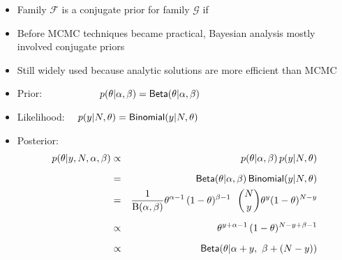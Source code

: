 \documentclass[10pt]{report}
\begin{document}
\begin{itemize}
\item Family $\mathcal{F}$ is a conjugate prior for family
  $\mathcal{G}$ if
\item Before MCMC techniques became practical, Bayesian analysis
  mostly involved conjugate priors
\item Still widely used because analytic solutions are more efficient
  than MCMC
\end{itemize}

\vspace*{-2pt}
\begin{itemize}
\item Prior: \ \ \ \ \ \ \ \ \ \ \ $p(\theta|\alpha,\beta) =
  \text{\sf Beta}(\theta|\alpha,\beta)$
\item Likelihood: \ \ $p(y|N,\theta) = \text{\sf Binomial}(y|N,\theta)$
\item Posterior:
{\small
\begin{eqnarray*}
p(\theta|y,N,\alpha,\beta)
& \propto & p(\theta|\alpha,\beta) \, p(y|N,\theta)
\\[6pt]
& = & \text{\sf Beta}(\theta|\alpha,\beta) 
      \, \text{\sf Binomial}(y|N,\theta)
\\
& = & \frac{1}{{\text B}(\alpha,\beta)} 
      \theta^{\alpha - 1} \, 
      (1 - \theta)^{\beta-1}
      \ \
      \binom{N}{y} \theta^{y} (1 - \theta)^{N-y}
\\[6pt]
& \propto & 
      \theta^{y + \alpha - 1} \, 
      (1 - \theta)^{N - y + \beta - 1}
\\[6pt]
& \propto & \text{\sf Beta}(\theta|\alpha + y, \ \beta + (N - y))
\end{eqnarray*}
}
\end{itemize}
\end{document}
